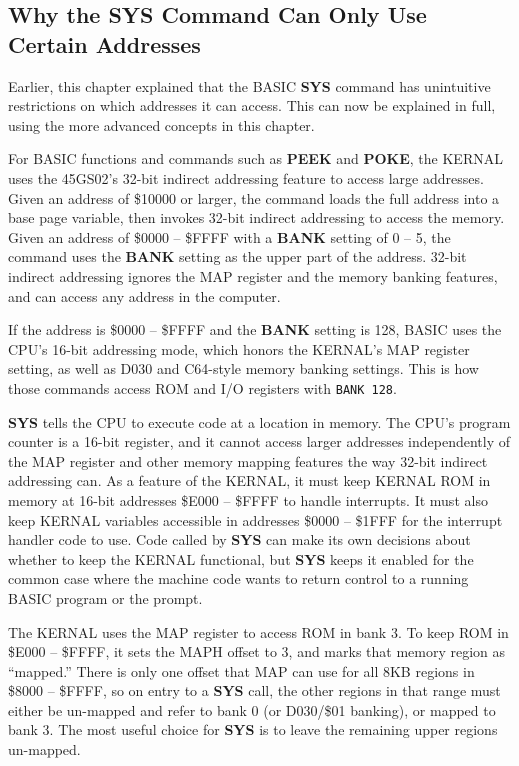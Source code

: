 \subsection{Why the SYS Command Can Only Use Certain Addresses}

Earlier, this chapter explained that the BASIC {\bf SYS} command has unintuitive restrictions on which addresses it can access. This can now be explained in full, using the more advanced concepts in this chapter.

For BASIC functions and commands such as {\bf PEEK} and {\bf POKE}, the KERNAL uses the 45GS02's 32-bit indirect addressing feature to access large addresses. Given an address of \$10000 or larger, the command loads the full address into a base page variable, then invokes 32-bit indirect addressing to access the memory. Given an address of \$0000 -- \$FFFF with a {\bf BANK} setting of 0 -- 5, the command uses the {\bf BANK} setting as the upper part of the address. 32-bit indirect addressing ignores the MAP register and the memory banking features, and can access any address in the computer.

If the address is \$0000 -- \$FFFF and the {\bf BANK} setting is 128, BASIC uses the CPU's 16-bit addressing mode, which honors the KERNAL's MAP register setting, as well as D030 and C64-style memory banking settings. This is how those commands access ROM and I/O registers with \texttt{BANK 128}.

{\bf SYS} tells the CPU to execute code at a location in memory. The CPU's program counter is a 16-bit register, and it cannot access larger addresses independently of the MAP register and other memory mapping features the way 32-bit indirect addressing can. As a feature of the KERNAL, it must keep KERNAL ROM in memory at 16-bit addresses \$E000 -- \$FFFF to handle interrupts. It must also keep KERNAL variables accessible in addresses \$0000 -- \$1FFF for the interrupt handler code to use. Code called by {\bf SYS} can make its own decisions about whether to keep the KERNAL functional, but {\bf SYS} keeps it enabled for the common case where the machine code wants to return control to a running BASIC program or the  prompt.

The KERNAL uses the MAP register to access ROM in bank 3. To keep ROM in \$E000 -- \$FFFF, it sets the MAPH offset to 3, and marks that memory region as ``mapped.'' There is only one offset that MAP can use for all 8KB regions in \$8000 -- \$FFFF, so on entry to a {\bf SYS} call, the other regions in that range must either be un-mapped and refer to bank 0 (or D030/\$01 banking), or mapped to bank 3. The most useful choice for {\bf SYS} is to leave the remaining upper regions un-mapped.

